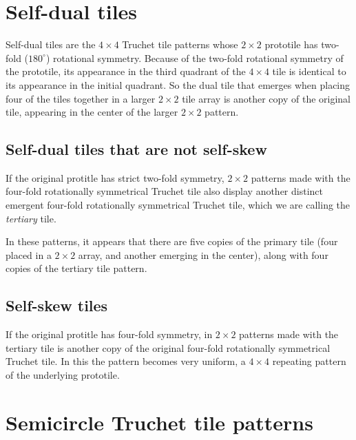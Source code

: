 \documentclass{tufte-book}
\begin{document}
\vspace{0.5cm}
\noindent

\noindent
\newpage



\chapter{Self-dual tiles}

\noindent
Self-dual tiles are the $4\times 4$ Truchet tile patterns whose $2\times 2$ prototile has two-fold ($180^{\circ}$) rotational symmetry. Because of the two-fold rotational symmetry of the prototile, its appearance in the third quadrant of the $4\times 4$ tile is identical to its appearance in the initial quadrant. So the dual tile that emerges when placing four of the tiles together in a larger $2\times 2$ tile array is another copy of the original tile, appearing in the center of the  larger $2\times 2$ pattern. 

\section{Self-dual tiles that are not self-skew}

If the original protitle has strict two-fold symmetry,  $2\times 2$ patterns made with the four-fold rotationally symmetrical Truchet tile also display another distinct emergent four-fold rotationally symmetrical Truchet tile, which we are calling the \textit{tertiary} tile. 

\noindent
In these patterns, it appears that there are five copies of the primary tile (four placed in a $2\times 2$ array, and another emerging in the center), along with four copies of the tertiary tile pattern.

{
\setlength{\tabcolsep}{0pt}
\renewcommand{\arraystretch}{0}

}
\section{Self-skew tiles}

\noindent
If the original protitle has four-fold symmetry, in $2\times 2$ patterns made with the tertiary tile is another copy of the original four-fold rotationally symmetrical Truchet tile. In this the pattern becomes very uniform, a $4\times4$ repeating pattern of the underlying prototile.

{
\setlength{\tabcolsep}{0pt}
\renewcommand{\arraystretch}{0}

}
\chapter{Semicircle Truchet tile patterns}
\end{document}
